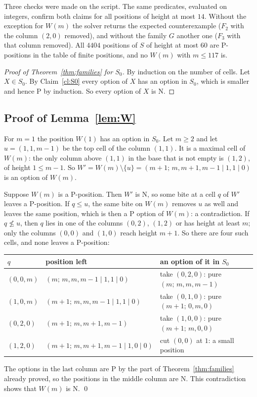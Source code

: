 \documentclass[11pt]{amsart}
\theoremstyle{definition}
\theoremstyle{remark}
\begin{document}
Three checks were made on the script. The same predicates, evaluated on integers, confirm both
claims for all positions of height at most $14$. Without the exception for $W(m)$ the solver
returns the expected counterexample ($F_2$ with the column $(2,0)$ removed), and without the
family $G$ another one ($F_3$ with that column removed). All $4404$ positions of $S$ of height
at most $60$ are P-positions in the table of finite positions, and no $W(m)$ with $m\le117$ is.

\begin{proof}[Proof of Theorem~\ref{thm:families} for $S_0$]
By induction on the number of cells. Let $X\in S_0$. By Claim~\ref{cl:S0} every option of $X$
has an option in $S_0$, which is smaller and hence P by induction. So every option of $X$ is N.
\end{proof}

\subsection{Proof of Lemma~\ref{lem:W}}
For $m=1$ the position $W(1)$ has an option in $S_0$. Let $m\ge2$ and let $u=(1,1,m-1)$ be the
top cell of the column $(1,1)$. It is a maximal cell of $W(m)$: the only column above $(1,1)$
in the base that is not empty is $(1,2)$, of height $1\le m-1$. So
$W'=W(m)\setminus\{u\}=(m+1;\,m,m+1,m-1\mid1,1\mid0)$ is an option of $W(m)$.

Suppose $W(m)$ is a P-position. Then $W'$ is N, so some bite at a cell $q$ of $W'$ leaves a
P-position. If $q\le u$, the same bite on $W(m)$ removes $u$ as well and leaves the same
position, which is then a P option of $W(m)$: a contradiction. If $q\not\le u$, then $q$ lies
in one of the columns $(0,2)$, $(1,2)$ or has height at least $m$; only the columns $(0,0)$ and
$(1,0)$ reach height $m+1$. So there are four such cells, and none leaves a P-position:
\begin{center}
\begin{tabular}{lll}
\toprule
$q$ & position left & an option of it in $S_0$\\
\midrule
$(0,0,m)$ & $(m;\,m,m,m-1\mid1,1\mid0)$ & take $(0,2,0)$: pure $(m;\,m,m,m-1)$\\
$(1,0,m)$ & $(m+1;\,m,m,m-1\mid1,1\mid0)$ & take $(0,1,0)$: pure $(m+1;\,0,m,0)$\\
$(0,2,0)$ & $(m+1;\,m,m+1,m-1)$ & take $(1,0,0)$: pure $(m+1;\,m,0,0)$\\
$(1,2,0)$ & $(m+1;\,m,m+1,m-1\mid1,0\mid0)$ & cut $(0,0)$ at $1$: a small position\\
\bottomrule
\end{tabular}
\end{center}
The options in the last column are P by the part of Theorem~\ref{thm:families} already proved,
so the positions in the middle column are N. This contradiction shows that $W(m)$ is N. \qed
\end{document}
